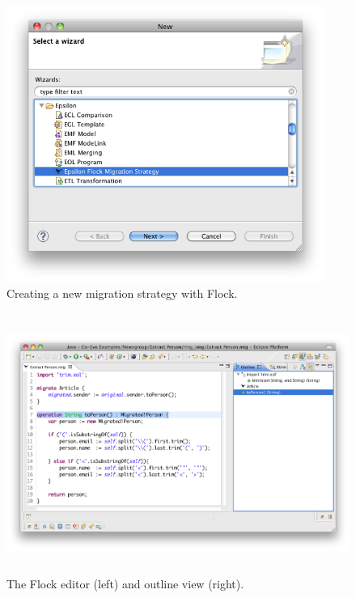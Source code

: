 \begin{figure}[tbp]
	\centering
		\includegraphics[height=9cm]{5.Implementation/images/flock_programmers_guide/new_migration_strategy.png}
	\caption{Creating a new migration strategy with Flock.}
	\label{fig:flock_new_migration_strategy}
\end{figure}


\begin{figure}[tbp]
	\centering
		\includegraphics[height=8.5cm]{5.Implementation/images/flock_programmers_guide/editor.png}
	\caption{The Flock editor (left) and outline view (right).}
	\label{fig:flock_editor_and_outline_view}
\end{figure}


